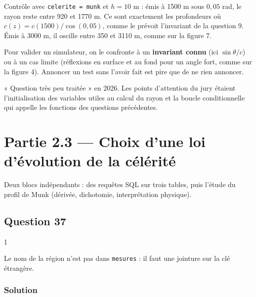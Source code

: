 \documentclass[11pt,a4paper]{article}
\begin{document}
Contrôle avec \texttt{celerite\ =\ munk} et \(h = 10\) m : émis à 1500 m sous \(0{,}05\) rad, le rayon reste entre 920 et 1770 m. Ce sont exactement les profondeurs où \(c(z) = c(1500)/\cos(0{,}05)\), comme le prévoit l'invariant de la question 9. Émis à 3000 m, il oscille entre 350 et 3110 m, comme sur la figure 7.

\begin{methode}

Pour valider un simulateur, on le confronte à un \textbf{invariant connu} (ici \(\sin\theta/c\)) ou à un cas limite (réflexions en surface et au fond pour un angle fort, comme sur la figure 4). Annoncer un test sans l'avoir fait est pire que de ne rien annoncer.

\end{methode}

\begin{jury}

« Question très peu traitée » en 2026. Les points d'attention du jury étaient l'initialisation des variables utiles au calcul du rayon et la boucle conditionnelle qui appelle les fonctions des questions précédentes.

\end{jury}

\hypertarget{partie-2.3-choix-dune-loi-duxe9volution-de-la-cuxe9luxe9rituxe9}{%
\section{Partie 2.3 --- Choix d'une loi d'évolution de la célérité}\label{partie-2.3-choix-dune-loi-duxe9volution-de-la-cuxe9luxe9rituxe9}}

Deux blocs indépendants : des requêtes SQL sur trois tables, puis l'étude du profil de Munk (dérivée, dichotomie, interprétation physique).

\hypertarget{question-37}{%
\subsection{Question 37}\label{question-37}}

\begin{indication}{1}

Le nom de la région n'est pas dans \texttt{mesures} : il faut une jointure sur la clé étrangère.

\end{indication}

\hypertarget{solution-36}{%
\subsubsection{Solution}\label{solution-36}}
\end{document}
